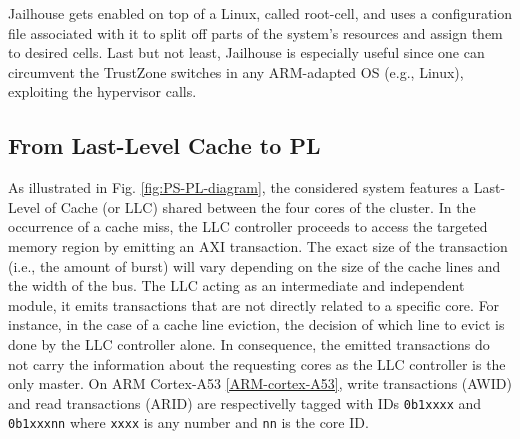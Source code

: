 Jailhouse gets enabled on top of a Linux, called root-cell, and uses a
configuration file associated with it to split off parts of the
system's resources and assign them to desired cells. Last but not
least, Jailhouse is especially useful since one can circumvent the
TrustZone switches in any ARM-adapted OS (e.g., Linux), exploiting the
hypervisor calls.

\subsection{From Last-Level Cache to PL}
As illustrated in Fig. \ref{fig:PS-PL-diagram}, the considered system
features a Last-Level of Cache (or LLC) shared between the four cores
of the cluster. In the occurrence of a cache miss, the LLC controller
proceeds to access the targeted memory region by emitting an AXI
transaction. The exact size of the transaction (i.e., the amount of
burst) will vary depending on the size of the cache lines and the
width of the bus. The LLC acting as an intermediate and independent
module, it emits transactions that are not directly related to a
specific core. For instance, in the case of a cache line eviction, the
decision of which line to evict is done by the LLC controller
alone. In consequence, the emitted transactions do not carry the
information about the requesting cores as the LLC controller is the
only master. On ARM Cortex-A53 \ref{ARM-cortex-A53}, write
transactions (AWID) and read transactions (ARID) are respectivelly
tagged with IDs \verb|0b1xxxx| and \verb|0b1xxxnn| where \verb|xxxx|
is any number and \verb|nn| is the core ID.


